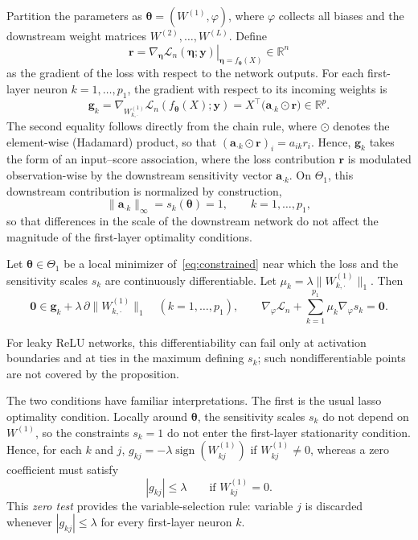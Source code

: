 \documentclass[twoside,11pt]{article}
\newcommand{\bth}{\boldsymbol{\theta}}
\newcommand{\ba}{\mathbf{a}}
\newcommand{\br}{\mathbf{r}}
\newcommand{\by}{\mathbf{y}}
\newcommand{\bzero}{\mathbf{0}}
\newcommand{\Wone}{W^{(1)}}
\newcommand{\PenWonek}{\|W^{(1)}_{k, \cdot}\|_1}
\newcommand{\R}{\mathbb{R}}
\newcommand{\Thetaone}{\Theta_{1}}
\begin{document}
Partition the parameters as $\bth=(\Wone,\varphi)$, where $\varphi$ collects all biases and the downstream weight matrices $W^{(2)},\ldots,W^{(L)}$. Define
\begin{equation*}
    \br=\left.\nabla_{\boldsymbol{\eta}}
    \mathcal L_n(\boldsymbol{\eta};\by)
    \right|_{\boldsymbol{\eta}=f_{\bth}(X)}
    \in\R^n
\end{equation*}
as the gradient of the loss with respect to the network outputs. For each first-layer neuron $k=1,\ldots,p_1$, the gradient with respect to its incoming weights is
\begin{equation}\label{eq:first-layer-gradient}
    \mathbf{g}_k=\nabla_{W^{(1)}_{k,\cdot}}
    \mathcal L_n\left(f_{\bth}(X);\by\right)
    =X^\top\big(\ba_{\cdot k}\odot\br\big)
    \in\R^p.
\end{equation}
The second equality follows directly from the chain rule, where $\odot$ denotes the element-wise (Hadamard) product, so that
$(\ba_{\cdot k}\odot\br)_i=a_{ik}r_i$. Hence, $\mathbf g_k$ takes the form of an input--score association, where the loss contribution $\br$ is modulated observation-wise by the downstream sensitivity vector $\ba_{\cdot k}$. On $\Thetaone$, this downstream contribution is normalized by construction,
\begin{equation*}
    \|\ba_{\cdot k}\|_\infty=s_k(\bth)=1,
    \qquad k=1,\ldots,p_1,
\end{equation*}
so that differences in the scale of the downstream network do not affect the magnitude of the first-layer optimality conditions.

\begin{proposition}
\label{prop:kkt}
Let $\bth\in\Thetaone$ be a local minimizer of~\eqref{eq:constrained}
near which the loss and the sensitivity scales $s_k$ are continuously
differentiable. Let $\mu_k=\lambda\PenWonek$. Then
\begin{equation}\label{eq:kkt}
    \bzero\in\mathbf g_k+\lambda\,\partial\PenWonek
    \quad(k=1,\ldots,p_1),
    \qquad
    \nabla_\varphi\mathcal{L}_n+
    \sum_{k=1}^{p_1}\mu_k\nabla_\varphi s_k=\bzero .
\end{equation}
\end{proposition}

For leaky ReLU networks, this differentiability can fail only at
activation boundaries and at ties in the maximum defining $s_k$; such nondifferentiable points are not covered by the proposition. 

The two conditions have familiar interpretations. The first is the usual lasso optimality condition. Locally around $\bth$, the sensitivity scales $s_k$ do not depend on $\Wone$, so the constraints $s_k=1$ do not enter the first-layer stationarity condition. Hence, for each $k$ and $j$, $g_{kj}=-\lambda\operatorname{sign}(W^{(1)}_{kj})$ if $W^{(1)}_{kj}\neq 0$, whereas a zero coefficient must satisfy
\begin{equation}\label{eq:zero-test}
    |g_{kj}|\leq\lambda
    \qquad\text{if }W^{(1)}_{kj}=0.
\end{equation}
This \emph{zero test} provides the variable-selection rule: variable $j$ is discarded whenever $|g_{kj}|\leq\lambda$ for every first-layer neuron $k$.
\end{document}
